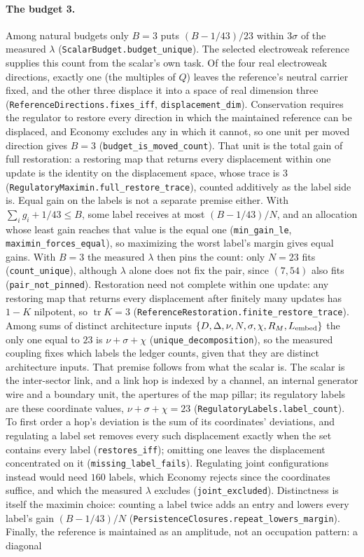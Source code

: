 \paragraph{The budget 3.} Among natural budgets only $B=3$ puts $(B-1/43)/23$ within $3\sigma$ of the measured $\lambda$ (\texttt{ScalarBudget.budget\_unique}). The selected electroweak reference supplies this count from the scalar's own task. Of the four real electroweak directions, exactly one (the multiples of $Q$) leaves the reference's neutral carrier fixed, and the other three displace it into a space of real dimension three (\texttt{ReferenceDirections.fixes\_iff}, \texttt{displacement\_dim}). Conservation requires the regulator to restore every direction in which the maintained reference can be displaced, and Economy excludes any in which it cannot, so one unit per moved direction gives $B=3$ (\texttt{budget\_is\_moved\_count}). That unit is the total gain of full restoration: a restoring map that returns every displacement within one update is the identity on the displacement space, whose trace is $3$ (\texttt{RegulatoryMaximin.full\_restore\_trace}), counted additively as the label side is. Equal gain on the labels is not a separate premise either. With $\sum_i g_i+1/43\le B$, some label receives at most $(B-1/43)/N$, and an allocation whose least gain reaches that value is the equal one (\texttt{min\_gain\_le}, \texttt{maximin\_forces\_equal}), so maximizing the worst label's margin gives equal gains. With $B=3$ the measured $\lambda$ then pins the count: only $N=23$ fits (\texttt{count\_unique}), although $\lambda$ alone does not fix the pair, since $(7,54)$ also fits (\texttt{pair\_not\_pinned}). Restoration need not complete within one update: any restoring map that returns every displacement after finitely many updates has $1-K$ nilpotent, so $\operatorname{tr}K=3$ (\texttt{ReferenceRestoration.finite\_restore\_trace}). Among sums of distinct architecture inputs $\{D,\Delta,\nu,N,\sigma,\chi,R_M,L_{\rm embed}\}$ the only one equal to $23$ is $\nu+\sigma+\chi$ (\texttt{unique\_decomposition}), so the measured coupling fixes which labels the ledger counts, given that they are distinct architecture inputs. That premise follows from what the scalar is. The scalar is the inter-sector link, and a link hop is indexed by a channel, an internal generator wire and a boundary unit, the apertures of the map pillar; its regulatory labels are these coordinate values, $\nu+\sigma+\chi=23$ (\texttt{RegulatoryLabels.label\_count}). To first order a hop's deviation is the sum of its coordinates' deviations, and regulating a label set removes every such displacement exactly when the set contains every label (\texttt{restores\_iff}); omitting one leaves the displacement concentrated on it (\texttt{missing\_label\_fails}). Regulating joint configurations instead would need $160$ labels, which Economy rejects since the coordinates suffice, and which the measured $\lambda$ excludes (\texttt{joint\_excluded}). Distinctness is itself the maximin choice: counting a label twice adds an entry and lowers every label's gain $(B-1/43)/N$ (\texttt{PersistenceClosures.repeat\_lowers\_margin}). Finally, the reference is maintained as an amplitude, not an occupation pattern: a diagonal 